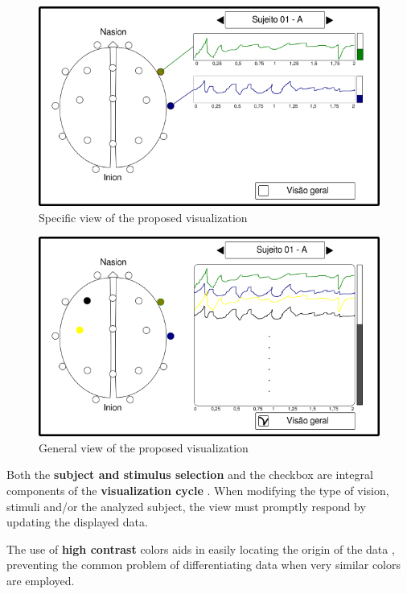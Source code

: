 \documentclass[format=sigconf]{acmart}
\begin{document}
		\begin{figure}[h]
			\centering
			\includegraphics[width=\linewidth]{../presentation/images/g3714}
			\caption{Specific view of the proposed visualization}
			\label{fig:g3714}
		\end{figure}
		
		\begin{figure}[h]
			\centering
			\includegraphics[width=\linewidth]{../presentation/images/g3762}
			\caption{General view of the proposed visualization}
			\label{fig:g3762}
		\end{figure}
	
		\par Both the \textbf{subject and stimulus selection} and the checkbox are integral components of the \textbf{visualization cycle} \cite{munzner2014visualization}. When modifying the type of vision, stimuli and/or the analyzed subject, the view must promptly respond by updating the displayed data.\newline
		
		\par The use of \textbf{high contrast} colors aids in easily locating the origin of the data \cite{spence2014information}, preventing the common problem of differentiating data when very similar colors are employed.\newline
		
\end{document}
